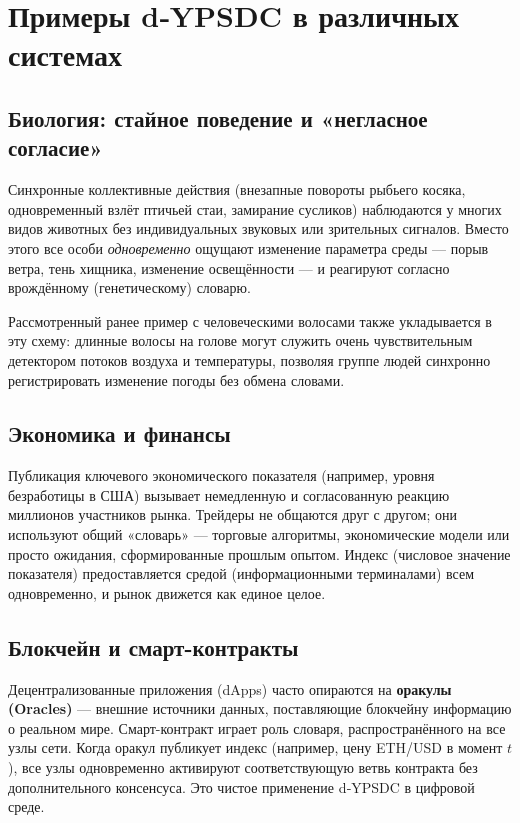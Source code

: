 \documentclass[11pt,a4paper]{article}
\begin{document}
	\section{Примеры d‑YPSDC в различных системах}
	
	\subsection{Биология: стайное поведение и «негласное согласие»}
	
	Синхронные коллективные действия (внезапные повороты рыбьего косяка, одновременный взлёт птичьей стаи, замирание сусликов) наблюдаются у многих видов животных без индивидуальных звуковых или зрительных сигналов. Вместо этого все особи \emph{одновременно} ощущают изменение параметра среды — порыв ветра, тень хищника, изменение освещённости — и реагируют согласно врождённому (генетическому) словарю.
	
	Рассмотренный ранее пример с человеческими волосами также укладывается в эту схему: длинные волосы на голове могут служить очень чувствительным детектором потоков воздуха и температуры, позволяя группе людей синхронно регистрировать изменение погоды без обмена словами.
	
	\subsection{Экономика и финансы}
	
	Публикация ключевого экономического показателя (например, уровня безработицы в США) вызывает немедленную и согласованную реакцию миллионов участников рынка. Трейдеры не общаются друг с другом; они используют общий «словарь» — торговые алгоритмы, экономические модели или просто ожидания, сформированные прошлым опытом. Индекс (числовое значение показателя) предоставляется средой (информационными терминалами) всем одновременно, и рынок движется как единое целое.
	
	\subsection{Блокчейн и смарт-контракты}
	
	Децентрализованные приложения (dApps) часто опираются на \textbf{оракулы (Oracles)} — внешние источники данных, поставляющие блокчейну информацию о реальном мире. Смарт-контракт играет роль словаря, распространённого на все узлы сети. Когда оракул публикует индекс (например, цену ETH/USD в момент \(t\)), все узлы одновременно активируют соответствующую ветвь контракта без дополнительного консенсуса. Это чистое применение d‑YPSDC в цифровой среде.
	
\end{document}
